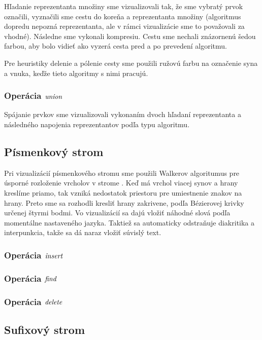 Hľadanie reprezentanta množiny sme vizualizovali tak, že sme vybratý prvok 
označili, vyznačili sme cestu do koreňa a reprezentanta množiny 
(algoritmus dopredu nepozná reprezentanta, ale v rámci vizualizácie sme to 
považovali za vhodné). Následne sme vykonali kompresiu. Cestu sme nechali 
znázornenú šedou farbou, aby bolo vidieť ako vyzerá cesta pred a po prevedení 
algoritmu. 

Pre heuristiky delenie a pólenie cesty sme použili ružovú farbu na označenie 
syna a vnuka, keďže tieto algoritmy s nimi pracujú.

\subsubsection{Operácia $\mathop{\mathit{union}}$}

Spájanie prvkov sme vizualizovali vykonaním dvoch hľadaní reprezentanta a 
následného napojenia reprezentantov podľa typu algoritmu.

\subsection{Písmenkový strom}

Pri vizualizácií písmenkového stromu sme použili 
Walkerov algoritumus pre úsporné rozloženie vrcholov v strome
\citep{walker}. Keď má vrchol viacej synov a hrany kreslíme priamo, tak vzniká 
nedostatok priestoru pre umiestnenie znakov na hrany. Preto sme sa rozhodli 
kresliť hrany zakrivene, podľa Bézierovej krivky určenej štyrmi bodmi. 
Vo vizualizácií sa dajú vložiť náhodné slová podľa momentálne nastaveného 
jazyka. Taktiež sa automaticky odstraňuje diakritika a interpunkcia, takže 
sa dá naraz vložiť súvislý text.

\subsubsection{Operácia $\mathop{\mathit{insert}}$}

\subsubsection{Operácia $\mathop{\mathit{find}}$}

\subsubsection{Operácia $\mathop{\mathit{delete}}$}

\subsection{Sufixový strom}

